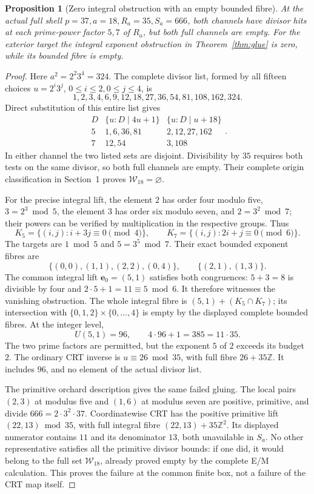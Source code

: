 \documentclass[11pt]{article}
\newtheorem{proposition}[theorem]{Proposition}
\theoremstyle{definition}\newtheorem{definition}[theorem]{Definition}
\theoremstyle{remark}\newtheorem{remark}[theorem]{Remark}
\newcommand{\Z}{\mathbb Z}\newcommand{\Q}{\mathbb Q}
\begin{document}
\begin{proposition}[Zero integral obstruction with an empty bounded fibre]
\label{prop:local-counterexample}
At the actual full shell \(p=37,a=18,R_a=35,S_a=666\), both
channels have divisor hits at each prime-power factor \(5,7\)
of \(R_a\), but both full channels are empty.  For the exterior
target the integral exponent obstruction in
Theorem~\ref{thm:glue} is zero, while its bounded fibre is empty.
\end{proposition}
\begin{proof}
Here \(a^2=2^2 3^4=324\).  The complete divisor list, formed by
all fifteen choices \(u=2^i3^j\), \(0\le i\le2,0\le j\le4\), is
\[
 1,2,3,4,6,9,12,18,27,36,54,81,108,162,324.
\]
Direct substitution of this entire list gives
\[
 \begin{array}{c|l|l}
 D&\{u:D\mid4u+1\}&\{u:D\mid u+18\}\\\hline
 5&1,6,36,81&2,12,27,162\\
 7&12,54&3,108
 \end{array}.
\]
In either channel the two listed sets are disjoint.  Divisibility
by \(35\) requires both tests on the same divisor, so both full
channels are empty.  Their complete origin classification in
Section~1 proves \(\mathcal W_{18}=\varnothing\).

For the precise integral lift, the element \(2\) has order four
modulo five, \(3=2^3\bmod5\), the element \(3\) has order six
modulo seven, and \(2=3^2\bmod7\); their powers can be verified
by multiplication in the respective groups.  Thus
\[
 K_5=\{(i,j):i+3j\equiv0\pmod4\},\qquad
 K_7=\{(i,j):2i+j\equiv0\pmod6\}.
\]
The targets are \(1\bmod5\) and \(5=3^5\bmod7\).
Their exact bounded exponent fibres are
\[
 \{(0,0),(1,1),(2,2),(0,4)\},\qquad
 \{(2,1),(1,3)\}.
\]
The common integral lift \(\boldsymbol e_0=(5,1)\) satisfies
both congruences:
\(5+3=8\) is divisible by four and \(2\cdot5+1=11\equiv5\bmod6\).
It therefore witnesses the vanishing obstruction.  The whole
integral fibre is
\((5,1)+(K_5\cap K_7)\); its intersection with
\(\{0,1,2\}\times\{0,\ldots,4\}\) is empty by the displayed
complete bounded fibres.  At the integer level,
\[
 U(5,1)=96,\qquad4\cdot96+1=385=11\cdot35.
\]
The two prime factors are permitted, but the exponent \(5\)
of \(2\) exceeds its budget \(2\).  The ordinary CRT inverse
is \(u\equiv26\bmod35\), with full fibre \(26+35\Z\).
It includes \(96\), and no element of the actual divisor list.

The primitive orchard description gives the same failed
gluing.  The local pairs \((2,3)\) at modulus five and
\((1,6)\) at modulus seven are positive, primitive, and divide
\(666=2\cdot3^2\cdot37\).  Coordinatewise CRT has the positive
primitive lift \((22,13)\bmod35\), with full integral fibre
\((22,13)+35\Z^2\).  Its displayed numerator contains \(11\)
and its denominator \(13\), both unavailable in \(S_a\).
No other representative satisfies all the primitive divisor
bounds: if one did, it would belong to the full set
\(\mathcal W_{18}\), already proved empty by the complete
E/M calculation.  This proves the failure at the common
finite box, not a failure of the CRT map itself.
\end{proof}
\end{document}
